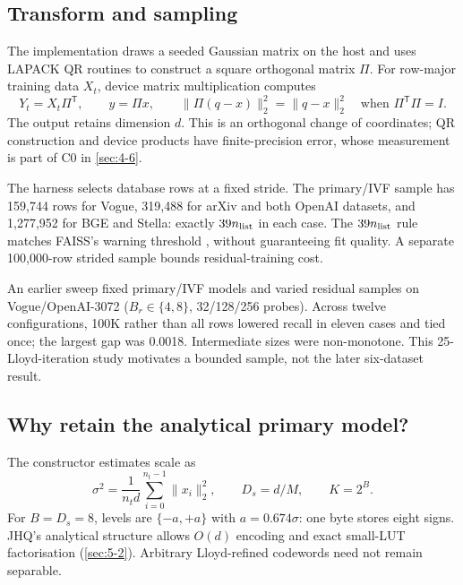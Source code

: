 \subsection{Transform and sampling}

The implementation draws a seeded Gaussian matrix on the host and uses
LAPACK QR routines to construct a square orthogonal matrix $\Pi$.
For row-major training data $X_t$, device matrix multiplication computes
\begin{equation}
 Y_t=X_t\Pi^{\mathsf T},\qquad y=\Pi x,\qquad
 \|\Pi(q-x)\|_2^2=\|q-x\|_2^2
 \quad\text{when }\Pi^{\mathsf T}\Pi=I.
 \label{eq:4-transform}
\end{equation}
The output retains dimension $d$. This is an orthogonal change of
coordinates; QR construction and device products have finite-precision
error, whose measurement is part of C0 in \cref{sec:4-6}.

The harness selects database rows at a fixed stride. The primary/IVF
sample has 159,744 rows for Vogue, 319,488 for arXiv and both OpenAI
datasets, and 1,277,952 for BGE and Stella: exactly $39n_{\rm list}$ in
each case. The $39n_{\rm list}$ rule matches FAISS's warning threshold \cite{faiss_clustering}, without guaranteeing fit quality. A separate 100,000-row strided sample bounds residual-training cost.

An earlier sweep fixed primary/IVF models and varied residual samples on Vogue/OpenAI-3072 ($B_r\in\{4,8\}$, 32/128/256 probes). Across twelve configurations, 100K rather than all rows lowered recall in eleven cases and tied once; the largest gap was 0.0018. Intermediate sizes were non-monotone. This 25-Lloyd-iteration study motivates a bounded sample, not the later six-dataset result.

\subsection{Why retain the analytical primary model?}

The constructor estimates scale as
\begin{equation}
 \sigma^2=\frac{1}{n_t d}\sum_{i=0}^{n_t-1}\|x_i\|_2^2,
 \qquad D_s=d/M,\qquad K=2^B.
 \label{eq:4-scale}
\end{equation}
For $B=D_s=8$, levels are $\{-a,+a\}$ with $a=0.674\sigma$: one byte stores eight signs. JHQ's analytical structure \cite{jhq} allows $O(d)$ encoding and exact small-LUT factorisation (\cref{sec:5-2}). Arbitrary Lloyd-refined codewords need not remain separable.

